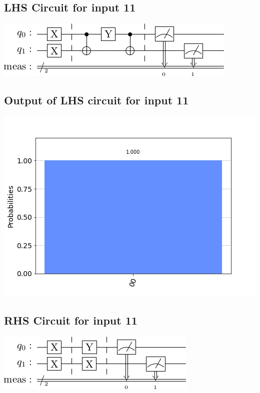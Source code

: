 \documentclass[a4paper]{article}
\begin{document}
\begin{answer}[Question 1 b (d)]
        \subsection*{LHS Circuit for input 11}
        \includegraphics[scale=0.5]{d111.png}
        \subsection*{Output of LHS circuit for input 11}
        \includegraphics[scale = 0.5]{d111-out.png}
        \subsection*{RHS Circuit for input 11}
        \includegraphics[scale=0.5]{d211.png}

\end{answer}
\end{document}
